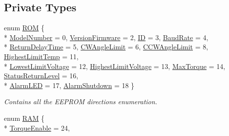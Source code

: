 \subsection*{Private Types}
\begin{DoxyCompactItemize}
\item 
enum \hyperlink{a00001_a08d272b502d65464202a3aa97825aec0}{R\+O\+M} \{ \\*
\hyperlink{a00001_a08d272b502d65464202a3aa97825aec0afaeddb6fc62aacc16e88f98a77efbcff}{Model\+Number} = 0, 
\hyperlink{a00001_a08d272b502d65464202a3aa97825aec0a234de9d5194d6b6f4e45b854dbf1442d}{Version\+Firmware} = 2, 
\hyperlink{a00001_a08d272b502d65464202a3aa97825aec0ab2565d5698c9d943a8bcecf02b1389ad}{I\+D} = 3, 
\hyperlink{a00001_a08d272b502d65464202a3aa97825aec0afa8229ff24576bd10b061c259cc1146d}{Baud\+Rate} = 4, 
\\*
\hyperlink{a00001_a08d272b502d65464202a3aa97825aec0a1e7fa07a9a5a28584a287668a95dbb4f}{Return\+Delay\+Time} = 5, 
\hyperlink{a00001_a08d272b502d65464202a3aa97825aec0aae428847c3648681e8aae8f0a12c6880}{C\+W\+Angle\+Limit} = 6, 
\hyperlink{a00001_a08d272b502d65464202a3aa97825aec0ac631a1a4dfb22cd02e863fa19f509523}{C\+C\+W\+Angle\+Limit} = 8, 
\hyperlink{a00001_a08d272b502d65464202a3aa97825aec0aa9f1a3f67a0bf70f6e6530cac9f55153}{Highest\+Limit\+Temp} = 11, 
\\*
\hyperlink{a00001_a08d272b502d65464202a3aa97825aec0a75d2b929c12ad95dfe84b3214e5badd5}{Lowest\+Limit\+Voltage} = 12, 
\hyperlink{a00001_a08d272b502d65464202a3aa97825aec0a39bed5183cada3039894ec459e9cdba4}{Highest\+Limit\+Voltage} = 13, 
\hyperlink{a00001_a08d272b502d65464202a3aa97825aec0aa45ee204b37e8a8657bbb0be1f3f2ee5}{Max\+Torque} = 14, 
\hyperlink{a00001_a08d272b502d65464202a3aa97825aec0a1f50b233b75db417410a9ad75671c5f8}{Status\+Return\+Level} = 16, 
\\*
\hyperlink{a00001_a08d272b502d65464202a3aa97825aec0a69af7afba3f29c206407f802a6975dd1}{Alarm\+L\+E\+D} = 17, 
\hyperlink{a00001_a08d272b502d65464202a3aa97825aec0a017096d92de6aa9fa691df824cd21757}{Alarm\+Shutdown} = 18
 \}
\begin{DoxyCompactList}\small\item\em Contains all the E\+E\+P\+R\+O\+M directions enumeration. \end{DoxyCompactList}\item 
enum \hyperlink{a00001_a672068c48bbee921e5856cc44b1c81c1}{R\+A\+M} \{ \\*
\hyperlink{a00001_a672068c48bbee921e5856cc44b1c81c1ac4597f1de691116b512ae043da6ae7a3}{Torque\+Enable} = 24, 

\end{DoxyCompactItemize}
